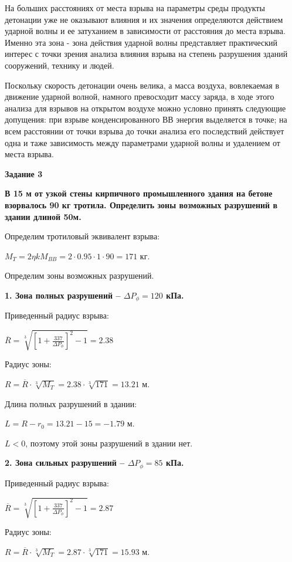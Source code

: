 \documentclass[a4paper,14pt]{article}
\begin{document}
На больших расстояниях от места взрыва на параметры среды продукты детонации уже не оказывают влияния и их значения определяются действием ударной волны и ее затуханием в зависимости от расстояния до места взрыва. Именно эта зона - зона действия ударной волны представляет практический интерес с точки зрения анализа влияния взрыва на степень разрушения зданий сооружений, технику и людей.

Поскольку скорость детонации очень велика, а масса воздуха, вовлекаемая в движение ударной волной, намного превосходит массу заряда, в ходе этого анализа для взрывов на открытом воздухе можно условно принять следующие допущения: при взрыве конденсированного ВВ энергия выделяется в точке; на всем расстоянии от точки взрыва до точки анализа его последствий действует одна и таже зависимость между параметрами ударной волны и удалением от места взрыва.

\textbf{Задание 3}

\textbf{ В 15 м от узкой стены кирпичного промышленного здания на бетоне взорвалось 90 кг тротила. Определить зоны возможных разрушений в здании длиной 50м.}

Определим тротиловый эквивалент взрыва:

$M_{T} = 2 \eta k M_{BB} = 2 \cdot 0.95 \cdot 1 \cdot 90 = 171$ кг.

Определим зоны возможных разрушений.

\textbf{1. Зона полных разрушений -- $\Delta P_{\phi} = 120$ кПа.}

Приведенный радиус взрыва:

$\overline{R} = \sqrt[3]{\left[ 1 + \frac{337}{\Delta P_{\phi}} \right]^2 - 1} = 2.38$

Радиус зоны:

$R = \overline{R} \cdot \sqrt[3]{M_{T}} = 2.38 \cdot \sqrt[3]{171} = 13.21$ м.

Длина полных разрушений в здании:

$L = R - r_0 = 13.21 - 15 = -1.79$ м.

$L < 0$, поэтому этой зоны разрушений в здании нет.

\newpage
\textbf{2. Зона сильных разрушений -- $\Delta P_{\phi} = 85$ кПа.}


Приведенный радиус взрыва:

$\overline{R} = \sqrt[3]{\left[ 1 + \frac{337}{\Delta P_{\phi}} \right]^2 - 1} = 2.87$

Радиус зоны:

$R = \overline{R} \cdot \sqrt[3]{M_{T}} = 2.87 \cdot \sqrt[3]{171} = 15.93$ м.
\end{document}
